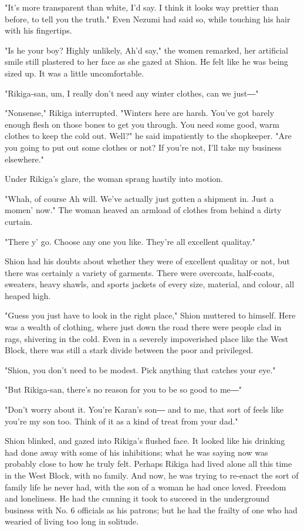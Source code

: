 "It's more transparent than white, I'd say. I think it looks way
prettier than before, to tell you the truth." Even Nezumi had said so,
while touching his hair with his fingertips.

"Is he your boy? Highly unlikely, Ah'd say," the women remarked, her
artificial smile still plastered to her face as she gazed at Shion. He
felt like he was being sized up. It was a little uncomfortable.

"Rikiga-san, um, I really don't need any winter clothes, can we just―"

"Nonsense," Rikiga interrupted. "Winters here are harsh. You've got
barely enough flesh on those bones to get you through. You need some
good, warm clothes to keep the cold out. Well?" he said impatiently to
the shopkeeper. "Are you going to put out some clothes or not? If you're
not, I'll take my business elsewhere."

Under Rikiga's glare, the woman sprang hastily into motion.

"Whah, of course Ah will. We've actually just gotten a shipment in. Just
a momen' now." The woman heaved an armload of clothes from behind a
dirty curtain.

"There y' go. Choose any one you like. They're all excellent qualitay."

Shion had his doubts about whether they were of excellent qualitay or
not, but there was certainly a variety of garments. There were
overcoats, half-coats, sweaters, heavy shawls, and sports jackets of
every size, material, and colour, all heaped high.

"Guess you just have to look in the right place," Shion muttered to
himself. Here was a wealth of clothing, where just down the road there
were people clad in rags, shivering in the cold. Even in a severely
impoverished place like the West Block, there was still a stark divide
between the poor and privileged.

"Shion, you don't need to be modest. Pick anything that catches your
eye."

"But Rikiga-san, there's no reason for you to be so good to me―"

"Don't worry about it. You're Karan's son― and to me, that sort of feels
like you're my son too. Think of it as a kind of treat from your dad."

Shion blinked, and gazed into Rikiga's flushed face. It looked like his
drinking had done away with some of his inhibitions; what he was saying
now was probably close to how he truly felt. Perhaps Rikiga had lived
alone all this time in the West Block, with no family. And now, he was
trying to re-enact the sort of family life he never had, with the son of
a woman he had once loved. Freedom and loneliness. He had the cunning it
took to succeed in the underground business with No. 6 officials as his
patrons; but he had the frailty of one who had wearied of living too
long in solitude.

